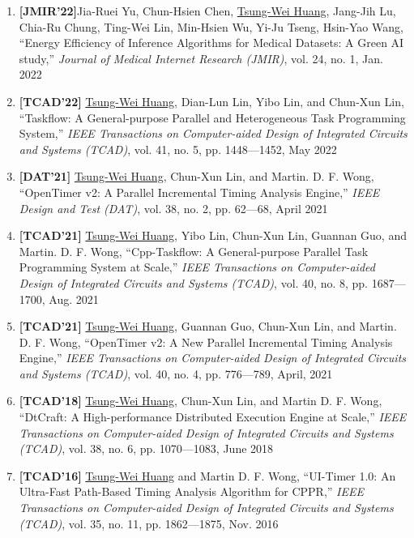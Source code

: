 \documentclass[A4,11pt]{article}
\begin{document}
\begin{enumerate}
  \item \textbf{[JMIR'22]}Jia-Ruei Yu, Chun-Hsien Chen, \underline{Tsung-Wei Huang}, Jang-Jih Lu, Chia-Ru Chung, Ting-Wei Lin, Min-Hsien Wu, Yi-Ju Tseng, Hsin-Yao Wang, ``Energy Efficiency of Inference Algorithms for Medical Datasets: A Green AI study,'' \textit{Journal of Medical Internet Research (JMIR)}, vol. 24, no. 1, Jan. 2022

  \item \textbf{[TCAD'22]} \underline{Tsung-Wei Huang}, Dian-Lun Lin, Yibo Lin, and Chun-Xun Lin, ``Taskflow: A General-purpose Parallel and Heterogeneous Task Programming System,'' \textit{IEEE Transactions on Computer-aided Design of Integrated Circuits and Systems (TCAD)}, vol. 41, no. 5, pp. 1448—1452, May 2022

  \item \textbf{[DAT'21]} \underline{Tsung-Wei Huang}, Chun-Xun Lin, and Martin. D. F. Wong, ``OpenTimer v2: A Parallel Incremental Timing Analysis Engine,'' \textit{IEEE Design and Test (DAT)}, vol. 38, no. 2, pp. 62—68, April 2021

  \item \textbf{[TCAD'21]} \underline{Tsung-Wei Huang}, Yibo Lin, Chun-Xun Lin, Guannan Guo, and Martin. D. F. Wong, ``Cpp-Taskflow: A General-purpose Parallel Task Programming System at Scale,'' \textit{IEEE Transactions on Computer-aided Design of Integrated Circuits and Systems (TCAD)}, vol. 40, no. 8, pp. 1687—1700, Aug. 2021

  \item \textbf{[TCAD'21]} \underline{Tsung-Wei Huang}, Guannan Guo, Chun-Xun Lin, and Martin. D. F. Wong, ``OpenTimer v2: A New Parallel Incremental Timing Analysis Engine,'' \textit{IEEE Transactions on Computer-aided Design of Integrated Circuits and Systems (TCAD)}, vol. 40, no. 4, pp. 776—789, April, 2021

  \item \textbf{[TCAD'18]} \underline{Tsung-Wei Huang}, Chun-Xun Lin, and Martin D. F. Wong, ``DtCraft: A High-performance Distributed Execution Engine at Scale,'' \textit{IEEE Transactions on Computer-aided Design of Integrated Circuits and Systems (TCAD)}, vol. 38, no. 6, pp. 1070—1083, June 2018

  \item \textbf{[TCAD'16]} \underline{Tsung-Wei Huang} and Martin D. F. Wong, ``UI-Timer 1.0: An Ultra-Fast Path-Based Timing Analysis Algorithm for CPPR,'' \textit{IEEE Transactions on Computer-aided Design of Integrated Circuits and Systems (TCAD)}, vol. 35, no. 11, pp. 1862—1875, Nov. 2016


\end{enumerate}
\end{document}
